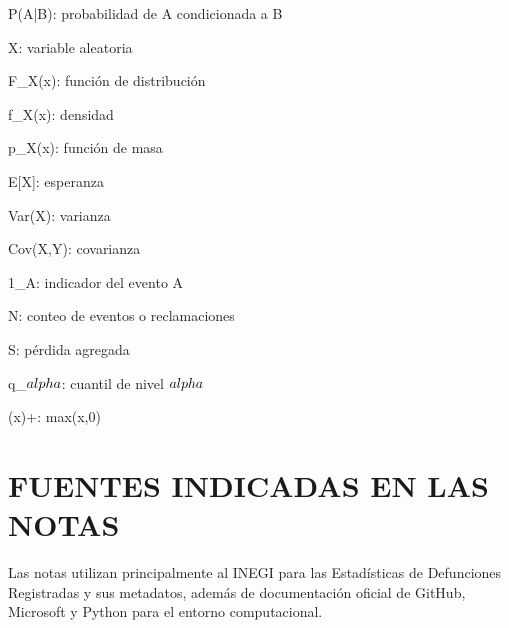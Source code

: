 \documentclass[11pt]{article}
\begin{document}
P(A|B): probabilidad de A condicionada a B

X: variable aleatoria

F\_X(x): función de distribución

f\_X(x): densidad

p\_X(x): función de masa

E[X]: esperanza

Var(X): varianza

Cov(X,Y): covarianza

1\_A: indicador del evento A

N: conteo de eventos o reclamaciones

S: pérdida agregada

q\_$\\alpha$: cuantil de nivel $\\alpha$

(x)+: max(x,0)

\section*{FUENTES INDICADAS EN LAS NOTAS}

Las notas utilizan principalmente al INEGI para las Estadísticas de Defunciones Registradas y sus metadatos, además de documentación oficial de GitHub, Microsoft y Python para el entorno computacional.
\end{document}
